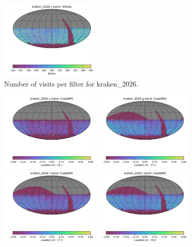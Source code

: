 \documentclass[DM,lsstdraft,authoryear,toc]{lsstdoc}
\begin{document}
\begin{figure}[ht]
\includegraphics[width=0.43\textwidth]{figures/kraken_2026_NVisits_y_band_HEAL_SkyMap}
\caption{Number of visits per filter for kraken\_2026.
\label{fig:baseline_nvisits}}
\end{figure}

\begin{figure}[ht]
\centering
\includegraphics[width=0.43\textwidth]{figures/kraken_2026_CoaddM5_u_band_HEAL_SkyMap}
\includegraphics[width=0.43\textwidth]{figures/kraken_2026_CoaddM5_g_band_HEAL_SkyMap} \\
\includegraphics[width=0.43\textwidth]{figures/kraken_2026_CoaddM5_r_band_HEAL_SkyMap}
\includegraphics[width=0.43\textwidth]{figures/kraken_2026_CoaddM5_i_band_HEAL_SkyMap}  \\

\end{figure}
\end{document}
